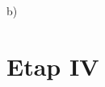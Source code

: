 \documentclass{article}\usepackage[]{graphicx}\usepackage[]{color}
\begin{document}
\begin{description}
\item{b)}

\end{description}

\section{Etap IV}
\end{document}
